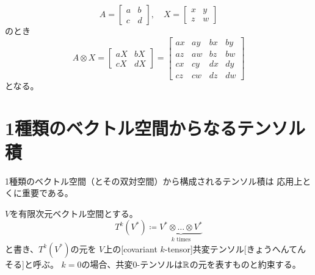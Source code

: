 \documentclass[report]{jlreq}
\begin{document}
\begin{example}
    \begin{equation}
        A = \begin{bmatrix}
            a & b \\
            c & d
        \end{bmatrix},
        \quad
        X = \begin{bmatrix}
            x & y \\
            z & w
        \end{bmatrix}
    \end{equation}
    のとき
    \begin{equation}
        A \otimes X
            = \begin{bmatrix}
                aX & bX \\
                cX & dX
            \end{bmatrix}
            = \begin{bmatrix}
                ax & ay & bx & by \\
                az & aw & bz & bw \\
                cx & cy & dx & dy \\
                cz & cw & dz & dw
            \end{bmatrix}
    \end{equation}
    となる。
\end{example}


%
\section{1種類のベクトル空間からなるテンソル積}

1種類のベクトル空間（とその双対空間）から構成されるテンソル積は
応用上とくに重要である。

\begin{definition}[共変テンソル]
    $V$を有限次元ベクトル空間とする。
    \begin{equation}
        T^k(V^*) \coloneqq \underbrace{V^* \otimes \dots \otimes V^*}_{k \text{ times}}
    \end{equation}
    と書き、$T^k(V^*)$の元を
    $V$上の[covariant $k$-tensor]{共変テンソル}[きょうへんてんそる]と呼ぶ。
    $k = 0$の場合、共変$0$-テンソルは$\mathbb{R}$の元を表すものと約束する。
\end{definition}
\end{document}
